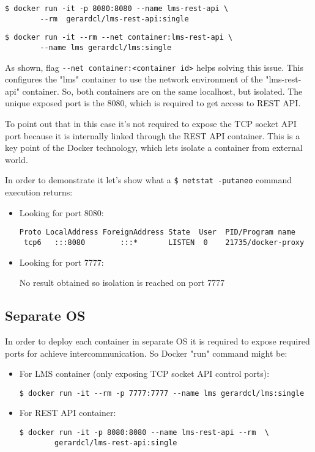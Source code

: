 \begin{verbatim}
$ docker run -it -p 8080:8080 --name lms-rest-api \
		--rm  gerardcl/lms-rest-api:single
\end{verbatim}
\begin{verbatim}
$ docker run -it --rm --net container:lms-rest-api \
		--name lms gerardcl/lms:single
\end{verbatim}

As shown, flag \verb|--net container:<container id>| helps solving this issue. This configures the "lms" container to use the network environment of the "lms-rest-api" container. So, both containers are on the same localhost, but isolated. The unique exposed port is the 8080, which is required to get access to REST API.

To point out that in this case it's not required to expose the TCP socket API port because it is internally linked through the REST API container. This is a key point of the Docker technology, which lets isolate a container from external world. 

In order to demonstrate it let's show what a \verb|$ netstat -putaneo| command  execution returns:
\begin{itemize}
\item Looking for port 8080: \hfill

\begin{verbatim}
Proto LocalAddress ForeignAddress State  User  PID/Program name 
 tcp6   :::8080        :::*       LISTEN  0    21735/docker-proxy
\end{verbatim}
\item Looking for port 7777: \hfill

No result obtained so isolation is reached on port 7777
\end{itemize}

\subsection{Separate OS}

In order to deploy each container in separate OS it is required to expose required ports for achieve intercommunication. So Docker "run" command might be:
\begin{itemize}
\item For LMS container (only exposing TCP socket API control ports): \hfill

\begin{verbatim}
$ docker run -it --rm -p 7777:7777 --name lms gerardcl/lms:single
\end{verbatim}
\item For REST API container: \hfill

\begin{verbatim}
$ docker run -it -p 8080:8080 --name lms-rest-api --rm  \
		gerardcl/lms-rest-api:single
\end{verbatim}
\end{itemize}

